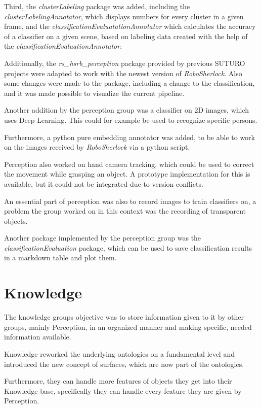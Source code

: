 \documentclass[main.tex]{subfiles}
\begin{document}
		Third, the \textit{clusterLabeling} package was added, including the \textit{clusterLabelingAnnotator}, which displays numbers for every cluster in a given frame, and the \textit{classificationEvaluatationAnnotator} which calculates the accuracy of a classifier on a given scene, based on labeling data created with the help of the \textit{classificationEvaluationAnnotator}. 
		
		Additionally, the \textit{rs\_hsrb\_perception} package provided by previous SUTURO projects were adapted to work with the newest version of \textit{RoboSherlock}. Also some changes were made to the package, including a change to the classification, and it was made possible to visualize the current pipeline.
		
		Another addition by the perception group was a classifier on 2D images, which uses Deep Learning. This could for example be used to recognize specific persons.
		
		Furthermore, a python pure embedding annotator was added, to be able to work on the images received by \textit{RoboSherlock} via a python script.
		
		Perception also worked on hand camera tracking, which could be used to correct the movement while grasping an object. A prototype implementation for this is available, but it could not be integrated due to version conflicts. 
		
		An essential part of perception was also to record images to train classifiers on, a problem the group worked on in this context was the recording of transparent objects.
		
		Another package implemented by the perception group was the \textit{classificationEvaluation} package, which can be used to save classification results in a markdown table and plot them.
		
		
		
		
		\section{Knowledge}
		The knowledge groups objective was to store information given to it by other groups, mainly Perception, in an organized manner and making specific, needed information available.
		
		Knowledge reworked the underlying ontologies on a fundamental level and introduced the new concept of surfaces, which are now part of the ontologies.
		
		Furthermore, they can handle more features of objects they get into their Knowledge base, specifically they can handle every feature they are given by Perception.
		
\end{document}
